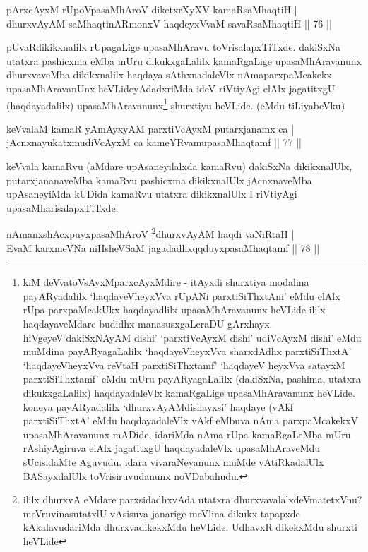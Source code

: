 \begin{shl}
pArxcAyxM rUpoVpasaMhAroV diketxrXyXV kamaRsaMhaqtiH |\\
dhurxvAyAM saMhaqtinARmonxV haqdeyxVvaM savaRsaMhaqtiH \hfill || 76 ||
\end{shl}

\begin{artha}
pUvaRdikikxnalilx rUpagaLige upasaMhAravu toVrisalapxTiTxde. dakiSxNa utatxra pashicxma eMba mUru dikukxgaLalilx kamaRgaLige upasaMhAravanunx dhurxvaveMba dikikxnalilx haqdaya sAthxnadaleVlx nAmaparxpaMcakekx upasaMhAravanUnx heVLideyAdadxriMda ideV riVtiyAgi elAlx jagatitxgU (haqdayadalilx) upasaMhAravanunx\footnote{kiM deVvatoV\s sAyxMparxcAyxMdire - itAyxdi shurxtiya modalina payARyadalilx `haqdayeVheyxVva rUpANi parxtiSiThxtAni' eMdu elAlx rUpa parxpaMcakUkx haqdayadlilx upasaMhAravanunx heVLide ililx haqdayaveMdare budidhx manasusxgaLeraDU gArxhayx. hiVgeyeV`dakiSxNAyAM dishi' `parxtiVcAyxM dishi' udiVcAyxM dishi' eMdu muMdina payARyagaLalilx `haqdayeVheyxVva sharxdAdhx parxtiSiThxtA' `haqdayeVheyxVva reVtaH parxtiSiThxtamf' `haqdayeV heyxVva satayxM parxtiSiThxtamf' eMdu mUru payARyagaLalilx (dakiSxNa, pashima, utatxra dikukxgaLalilx) haqdayadaleVlx kamaRgaLige upasaMhAravanunx heVLide. koneya payARyadalilx `dhurxvAyAMdishayxsi' haqdaye (vAkf parxtiSiThxtA' eMdu haqdayadaleVlx vAkf eMbuva nAma parxpaMcakekxV upasaMhAravanunx mADide, idariMda nAma rUpa kamaRgaLeMba mUru rAshiyAgiruva elAlx jagatitxgU haqdayadaleVlx upasaMhAraveMdu sUcisidaMte Aguvudu. idara vivaraNeyanunx muMde vAtiRkadalUlx BASayxdalUlx toVrisiruvudanunx noVDabahudu.} shurxtiyu heVLide. (eMdu tiLiyabeVku)
\end{artha}


\begin{shl}
keVvalaM kamaR yAmAyxyAM parxtiVcAyxM putarxjanamx ca |\\
jAcnxnayukatxmudiVcAyxM ca kameYRvamupasaMhaqtamf \hfill || 77 ||
\end{shl}

\begin{artha}
keVvala kamaRvu (aMdare upAsaneyilalxda kamaRvu) dakiSxNa dikikxnalUlx, putarxjananaveMba kamaRvu pashicxma dikikxnalUlx jAcnxnaveMba upAsaneyiMda kUDida kamaRvu utatxra dikikxnalUlx I riVtiyAgi upasaMharisalapxTiTxde.
\end{artha}

\begin{shl}
nAmanxshAcxpuyxpasaMhAroV \footnote{ililx dhurxvA eMdare parxsidadhxvAda utatxra dhurxvavalalxdeVmatetxVnu? meVruvinasutatxlU vAsisuva janarige meVlina dikukx tapapxde kAkalavudariMda dhurxvadikekxMdu heVLide. UdhavxR dikekxMdu shurxti heVLide}dhurxvAyAM haqdi vaNiRtaH |\\
EvaM karxmeVNa niHsheVSaM jagadadhxqqduyxpasaMhaqtamf \hfill || 78 ||
\end{shl}

